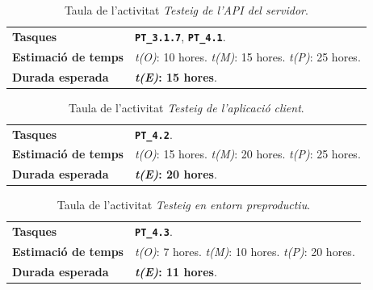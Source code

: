 \documentclass[a4paper,12pt]{ThesisStyle}
\begin{document}
\begin{table}[H]
  \begin{tabularx}{\textwidth}{l | X}
    \toprule
    \rowcolor{Orange}
    \multicolumn{2}{c}{\texttt{\textbf{A17:}} Testeig de l'API del servidor}\\
    \midrule[0.9pt]
    \textbf{Tasques}                 & \texttt{\textbf{PT\_3.1.7}}, \texttt{\textbf{PT\_4.1}}.\\
    \midrule
    \textbf{Estimació de temps}      & \textit{t(O)}: 10 hores.
    \newline \textit{t(M)}: 15 hores.
    \newline \textit{t(P)}: 25 hores.\\
    \midrule
    \textbf{Durada esperada}         & \textbf{\textit{t(E)}: 15 hores}.\\
    \bottomrule
  \end{tabularx}
  \caption{\label{taula:a17} Taula de l'activitat \emph{Testeig de l'API del servidor}.}
\end{table}

\begin{table}[H]
  \begin{tabularx}{\textwidth}{l | X}
    \toprule
    \rowcolor{Orange}
    \multicolumn{2}{c}{\texttt{\textbf{A18:}} Testeig de l'aplicació client}\\
    \midrule[0.9pt]
    \textbf{Tasques}                 & \texttt{\textbf{PT\_4.2}}.\\
    \midrule
    \textbf{Estimació de temps}      & \textit{t(O)}: 15 hores.
    \newline \textit{t(M)}: 20 hores.
    \newline \textit{t(P)}: 25 hores.\\
    \midrule
    \textbf{Durada esperada}         & \textbf{\textit{t(E)}: 20 hores}.\\
    \bottomrule
  \end{tabularx}
  \caption{\label{taula:a18} Taula de l'activitat \emph{Testeig de l'aplicació client}.}
\end{table}

\begin{table}[H]
  \begin{tabularx}{\textwidth}{l | X}
    \toprule
    \rowcolor{Orange}
    \multicolumn{2}{c}{\texttt{\textbf{A19:}} Testeig en entorn preproductiu}\\
    \midrule[0.9pt]
    \textbf{Tasques}                 & \texttt{\textbf{PT\_4.3}}.\\
    \midrule
    \textbf{Estimació de temps}      & \textit{t(O)}: 7 hores.
    \newline \textit{t(M)}: 10 hores.
    \newline \textit{t(P)}: 20 hores.\\
    \midrule
    \textbf{Durada esperada}         & \textbf{\textit{t(E)}: 11 hores}.\\
    \bottomrule
  \end{tabularx}
  \caption{\label{taula:a19} Taula de l'activitat \emph{Testeig en entorn preproductiu}.}
\end{table}
\end{document}
